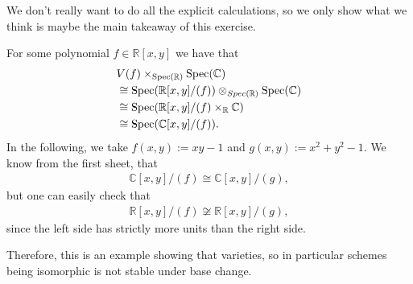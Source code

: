 \begin{exercise}{4}
    We don't really want to do all the explicit calculations, so we only show what we think
    is maybe the main takeaway of this exercise.

    For some polynomial $f\in \mathbb{R}[x,y]$ we have that 
    \begin{align*}
        &V(f) \times_{\operatorname{Spec}(\mathbb{R})} \operatorname{Spec}(\mathbb{C})\\
        &\cong \operatorname{Spec}(\mathbb{R}[x,y]/(f)) \otimes_{Spec(\mathbb{R})}\operatorname{Spec}(\mathbb{C})\\
        &\cong \operatorname{Spec}(\mathbb{R}[x,y]/(f)\times_\mathbb{R} \mathbb{C})\\
        &\cong \operatorname{Spec}(\mathbb{C}[x,y]/(f)).
    \end{align*}
    In the following, we take $f(x,y):=xy-1$ and $g(x,y):=x^2+y^2-1$. We know from 
    the first sheet, that 
    \begin{align*}
        \mathbb{C}[x,y]/(f)\cong \mathbb{C}[x,y]/(g),
    \end{align*}
    but one can easily check that
    \begin{align*}
        \mathbb{R}[x,y]/(f) \not \cong \mathbb{R}[x,y]/(g),
    \end{align*}
    since the left side has strictly more units than the right side.

    Therefore, this is an example showing that varieties, so in particular schemes being isomorphic 
    is not stable under base change.
\end{exercise}

